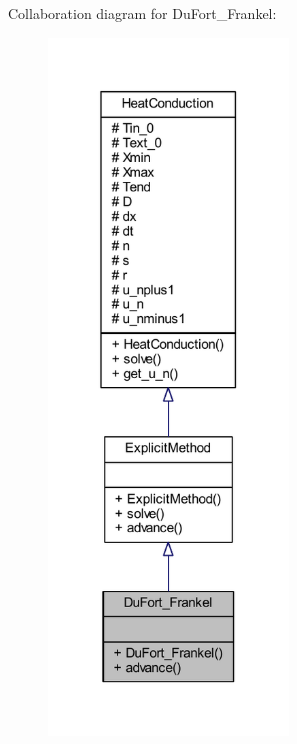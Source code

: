 Collaboration diagram for Du\+Fort\+\_\+\+Frankel\+:
\nopagebreak
\begin{figure}[H]
\begin{center}
\leavevmode
\includegraphics[width=181pt]{class_du_fort___frankel__coll__graph}
\end{center}
\end{figure}
